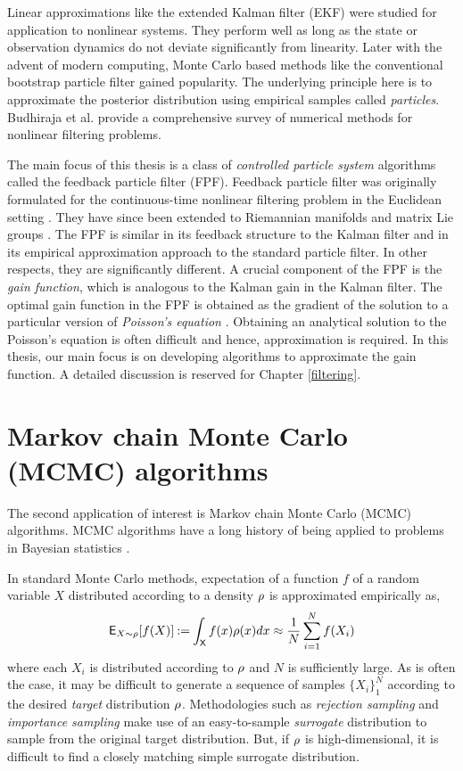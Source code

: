 Linear approximations like the extended Kalman filter (EKF) were studied for application to nonlinear systems. They perform well as long as the state or observation dynamics do not deviate significantly from linearity. Later with the advent of modern computing, Monte Carlo based methods like the conventional bootstrap particle filter gained popularity. The underlying principle here is to approximate the posterior distribution using empirical samples called \textit{particles}. Budhiraja et al. \cite{budchelee07} provide a comprehensive survey of numerical methods for nonlinear filtering problems. 

The main focus of this thesis is a class of \textit{controlled particle system} algorithms called the feedback particle filter (FPF). Feedback particle filter was originally formulated for the continuous-time nonlinear filtering problem in the Euclidean setting \cite{yanmehmey13}. They have since been extended to Riemannian manifolds and matrix Lie groups \cite{zhatagmeh16}. The FPF is similar in its feedback structure to the Kalman filter and in its empirical approximation approach to the standard particle filter. In other respects, they are significantly different. A crucial component of the FPF is the \textit{gain function}, which is analogous to the Kalman gain in the Kalman filter. The optimal gain function in the FPF is obtained as the gradient of the solution to a particular version of \textit{Poisson's equation} \cite{yanmehmey13, laumehmeyrag14}. Obtaining an analytical solution to the Poisson's equation is often difficult and hence, approximation is required. In this thesis, our main focus is on developing algorithms to approximate the gain function. A detailed discussion is reserved for Chapter \ref{filtering}. 

\section{Markov chain Monte Carlo (MCMC) algorithms}
The second application of interest is Markov chain Monte Carlo (MCMC) algorithms. MCMC algorithms have a long history of being applied to problems in Bayesian statistics \cite{}. 

In standard Monte Carlo methods, expectation of a function $f$ of a random variable $X$ distributed according to a density $\rho$ is approximated empirically as,
\[
 {\sf E}_{X \sim \rho} [f(X)] \mathbin{:=} \int_{\sf X} f(x)\rho(x) dx \approx \frac{1}{N} \sum_{i=1}^N f(X_i) 
\]
where each $X_i$ is distributed according to $\rho$ and $N$ is sufficiently large. As is often the case, it may be difficult to generate a sequence of samples $\{X_i\}_1^N$ according to the desired \textit{target} distribution $\rho$. Methodologies such as \textit{rejection sampling} and \textit{importance sampling} make use of an easy-to-sample \textit{surrogate} distribution to sample from the original target distribution. But, if $\rho$ is high-dimensional, it is difficult to find a closely matching simple surrogate distribution. 

